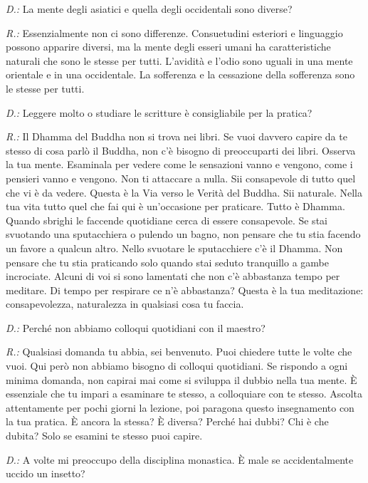 \emph{D.:} La mente degli asiatici e quella degli occidentali sono diverse?

\emph{R.:} Essenzialmente non ci sono differenze. Consuetudini esteriori e
linguaggio possono apparire diversi, ma la mente degli esseri umani ha
caratteristiche naturali che sono le stesse per tutti. L'avidità e
l'odio sono uguali in una mente orientale e in una occidentale. La
sofferenza e la cessazione della sofferenza sono le stesse per tutti.

\emph{D.:} Leggere molto o studiare le scritture è consigliabile per la
pratica?

\emph{R.:} Il Dhamma del Buddha non si trova nei libri. Se vuoi davvero capire
da te stesso di cosa parlò il Buddha, non c'è bisogno di preoccuparti
dei libri. Osserva la tua mente. Esaminala per vedere come le sensazioni
vanno e vengono, come i pensieri vanno e vengono. Non ti attaccare a
nulla. Sii consapevole di tutto quel che vi è da vedere. Questa è la Via
verso le Verità del Buddha. Sii naturale. Nella tua vita tutto quel che
fai qui è un'occasione per praticare. Tutto è Dhamma. Quando sbrighi le
faccende quotidiane cerca di essere consapevole. Se stai svuotando una
sputacchiera o pulendo un bagno, non pensare che tu stia facendo un
favore a qualcun altro. Nello svuotare le sputacchiere c'è il Dhamma.
Non pensare che tu stia praticando solo quando stai seduto tranquillo a
gambe incrociate. Alcuni di voi si sono lamentati che non c'è abbastanza
tempo per meditare. Di tempo per respirare ce n'è abbastanza? Questa è
la tua meditazione: consapevolezza, naturalezza in qualsiasi cosa tu
faccia.

\emph{D.:} Perché non abbiamo colloqui quotidiani con il maestro?

\emph{R.:} Qualsiasi domanda tu abbia, sei benvenuto. Puoi chiedere tutte le
volte che vuoi. Qui però non abbiamo bisogno di colloqui quotidiani. Se
rispondo a ogni minima domanda, non capirai mai come si sviluppa il
dubbio nella tua mente. È essenziale che tu impari a esaminare te
stesso, a colloquiare con te stesso. Ascolta attentamente per pochi
giorni la lezione, poi paragona questo insegnamento con la tua pratica.
È ancora la stessa? È diversa? Perché hai dubbi? Chi è che dubita? Solo
se esamini te stesso puoi capire.

\emph{D.:} A volte mi preoccupo della disciplina monastica. È male se
accidentalmente uccido un insetto?

